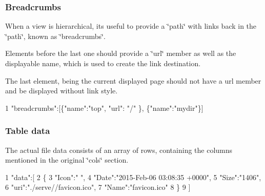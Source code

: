 \subsubsection*{Breadcrumbs}

When a view is hierarchical, it\textquotesingle{}s useful to provide a \char`\"{}path\char`\"{} with links back in the \char`\"{}path\char`\"{}, known as \char`\"{}breadcrumbs\char`\"{}.

Elements before the last one should provide a \char`\"{}url\char`\"{} member as well as the displayable name, which is used to create the link destination.

The last element, being the current displayed page should not have a url member and be displayed without link style.


\begin{DoxyCode}
1 "breadcrumbs":[\{"name":"top", "url": "/" \}, \{"name":"mydir"\}]
\end{DoxyCode}


\subsubsection*{Table data}

The actual file data consists of an array of rows, containing the columns mentioned in the original \char`\"{}cols\char`\"{} section.


\begin{DoxyCode}
1 "data":[
2         \{
3          "Icon":" ",
4          "Date":"2015-Feb-06 03:08:35 +0000",
5          "Size":"1406",
6          "uri":"./serve//favicon.ico",
7          "Name":"favicon.ico"
8         \}
9 ]
\end{DoxyCode}
 